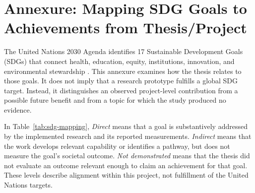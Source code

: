 \clearpage
\chapter*{Annexure: Mapping SDG Goals to Achievements from Thesis/Project}

The United Nations 2030 Agenda identifies 17 Sustainable Development Goals (SDGs) that connect health, education, equity, institutions, innovation, and environmental stewardship \cite{un2015sdgs}. This annexure examines how the thesis relates to those goals. It does not imply that a research prototype fulfills a global SDG target. Instead, it distinguishes an observed project-level contribution from a possible future benefit and from a topic for which the study produced no evidence.

In Table~\ref{tab:sdg-mapping}, \emph{Direct} means that a goal is substantively addressed by the implemented research and its reported measurements. \emph{Indirect} means that the work develops relevant capability or identifies a pathway, but does not measure the goal's societal outcome. \emph{Not demonstrated} means that the thesis did not evaluate an outcome relevant enough to claim an achievement for that goal. These levels describe alignment within this project, not fulfillment of the United Nations targets.

\begingroup
\small
\setlength{\tabcolsep}{3pt}
\renewcommand{\arraystretch}{1.18}

